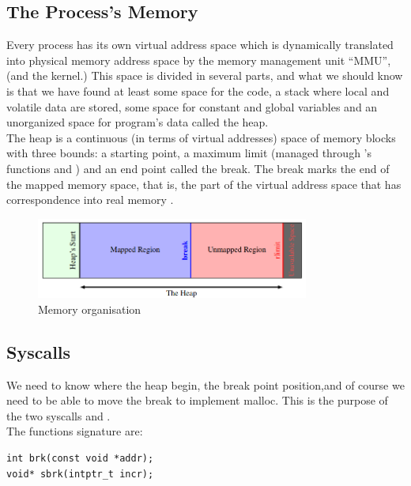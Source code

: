 \subsection{The Process’s Memory}
Every process has its own virtual address space which is dynamically translated into physical memory  address space by the memory management unit ``MMU'', (and the kernel.) This space is divided in several parts, and what we should know is that we have found at least some space for the code, a stack where local and volatile data are stored, some space for constant and global variables and an unorganized space for program’s data called the heap.\\

The heap is a continuous (in terms of virtual addresses) space of memory blocks with three bounds: a starting point, a maximum limit (managed through ’s functions  and ) and an end point called the break. The break marks the end of the mapped memory space, that is, the part of the virtual address space that has correspondence into real memory \cite{WilsonJNB95}.\\

\begin{figure}[H]
    \begin{center}
        \includegraphics[width=0.8\textwidth]{figures/heap}
    \caption{Memory organisation}
    \label{default}
    \end{center}
\end{figure}

\subsection{Syscalls}
We need to know where the heap begin, the break point position,and of course we need to be able to move the break to implement malloc. This is the purpose of the two syscalls  and .\\

The functions signature are:
\begin{lstlisting}[style=cstyle]
int brk(const void *addr);
void* sbrk(intptr_t incr);
\end{lstlisting}


